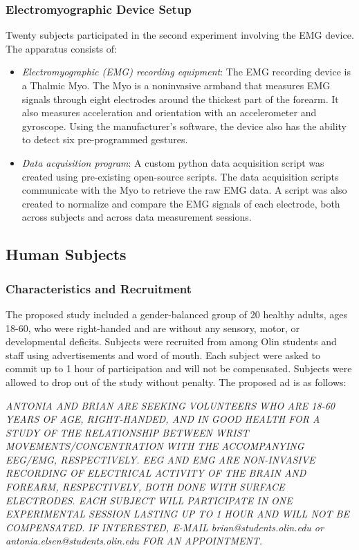 \documentclass[journal]{IEEEtran}
\begin{document}
\subsubsection{Electromyographic Device Setup}
Twenty subjects participated in the second experiment involving the EMG device.
The apparatus consists of: 
\begin{itemize}
    \item \textit{Electromyographic (EMG) recording equipment}: The EMG recording device is a Thalmic Myo. The Myo is a noninvasive armband that measures EMG signals through eight electrodes around the thickest part of the forearm. It also measures acceleration and orientation with an accelerometer and gyroscope. Using the manufacturer's software, the device also has the ability to detect six pre-programmed gestures.
    \item \textit{Data acquisition program}: A custom python data acquisition script was created using pre-existing open-source scripts. The data acquisition scripts communicate with the Myo to retrieve the raw EMG data. A script was also created to normalize and compare the EMG signals of each electrode, both across subjects and across data measurement sessions.
\end{itemize}
   
\subsection{Human Subjects}
\subsubsection{Characteristics and Recruitment}
The proposed study included a gender-balanced group of 20 healthy adults, ages 18-60, who were right-handed and are without any sensory, motor, or developmental deficits. Subjects were recruited from among Olin students and staff using advertisements and word of mouth. Each subject were asked to commit up to 1 hour of participation and will not be compensated. Subjects were allowed to drop out of the study without penalty.
The proposed ad is as follows: \par

\vspace{5mm}
\linebreak
\scriptsize \textit{ANTONIA AND BRIAN ARE SEEKING VOLUNTEERS WHO ARE 18-60 YEARS OF AGE, RIGHT-HANDED, AND IN GOOD HEALTH FOR A STUDY OF THE RELATIONSHIP BETWEEN WRIST MOVEMENTS/CONCENTRATION WITH THE ACCOMPANYING EEG/EMG, RESPECTIVELY. EEG AND EMG ARE NON-INVASIVE RECORDING OF ELECTRICAL ACTIVITY OF THE BRAIN AND FOREARM, RESPECTIVELY, BOTH DONE WITH SURFACE ELECTRODES. EACH SUBJECT WILL PARTICIPATE IN ONE EXPERIMENTAL SESSION LASTING UP TO 1 HOUR AND WILL NOT BE COMPENSATED. IF INTERESTED, E-MAIL brian@students.olin.edu or antonia.elsen@students.olin.edu FOR AN APPOINTMENT.} \par
\end{document}
